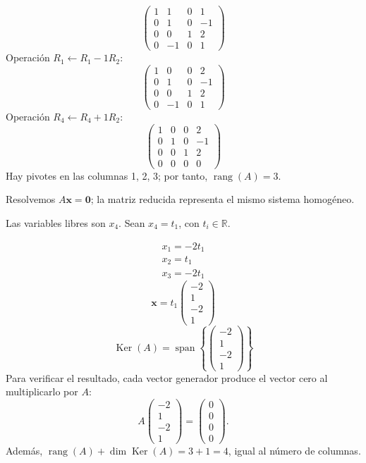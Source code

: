 \documentclass[12pt]{article}
\newcommand{\rang}{\operatorname{rang}}
\newcommand{\Ker}{\operatorname{Ker}}
\newcommand{\vect}[1]{\boldsymbol{#1}}
\begin{document}
\[
\begin{pmatrix}1&1&0&1\\0&1&0&-1\\0&0&1&2\\0&-1&0&1\end{pmatrix}
\]
Operación $R_{1}\leftarrow R_{1}-1R_{2}$:
\[
\begin{pmatrix}1&0&0&2\\0&1&0&-1\\0&0&1&2\\0&-1&0&1\end{pmatrix}
\]
Operación $R_{4}\leftarrow R_{4}+1R_{2}$:
\[
\begin{pmatrix}1&0&0&2\\0&1&0&-1\\0&0&1&2\\0&0&0&0\end{pmatrix}
\]
Hay pivotes en las columnas 1, 2, 3; por tanto, $\boxed{\rang(A)=3}$.

Resolvemos $A\vect x=\vect0$; la matriz reducida representa el mismo sistema homogéneo.

Las variables libres son $x_{4}$. Sean $x_{4}=t_{1}$, con $t_i\in\mathbb R$.

\[
\begin{aligned}x_{1}=- 2 t_{1}\\x_{2}=t_{1}\\x_{3}=- 2 t_{1}\end{aligned}
\]
\[
\vect x=t_{1}\begin{pmatrix}-2\\1\\-2\\1\end{pmatrix}
\]
\[
\boxed{\Ker(A)=\operatorname{span}\left\{\begin{pmatrix}-2\\1\\-2\\1\end{pmatrix}\right\}}
\]
Para verificar el resultado, cada vector generador produce el vector cero al multiplicarlo por $A$:
\[
A\begin{pmatrix}-2\\1\\-2\\1\end{pmatrix}=\begin{pmatrix}0\\0\\0\\0\end{pmatrix}.
\]
Además, $\rang(A)+\dim\Ker(A)=3+1=4$, igual al número de columnas.
\end{document}
